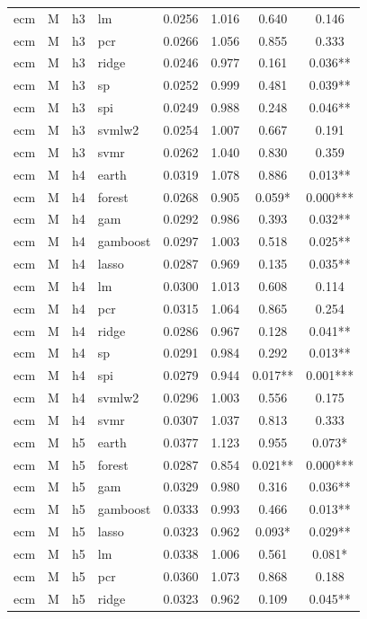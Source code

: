 \begin{ThreePartTable}
\begin{longtable}[t]{llclcccc}
ecm & M & h3 & lm & 0.0256 & 1.016 & 0.640 & 0.146\\
ecm & M & h3 & pcr & 0.0266 & 1.056 & 0.855 & 0.333\\
ecm & M & h3 & ridge & 0.0246 & 0.977 & 0.161 & 0.036**\\
ecm & M & h3 & sp & 0.0252 & 0.999 & 0.481 & 0.039**\\
ecm & M & h3 & spi & 0.0249 & 0.988 & 0.248 & 0.046**\\
ecm & M & h3 & svmlw2 & 0.0254 & 1.007 & 0.667 & 0.191\\
ecm & M & h3 & svmr & 0.0262 & 1.040 & 0.830 & 0.359\\
\addlinespace
ecm & M & h4 & earth & 0.0319 & 1.078 & 0.886 & 0.013**\\
ecm & M & h4 & forest & 0.0268 & 0.905 & 0.059* & 0.000***\\
ecm & M & h4 & gam & 0.0292 & 0.986 & 0.393 & 0.032**\\
ecm & M & h4 & gamboost & 0.0297 & 1.003 & 0.518 & 0.025**\\
ecm & M & h4 & lasso & 0.0287 & 0.969 & 0.135 & 0.035**\\
ecm & M & h4 & lm & 0.0300 & 1.013 & 0.608 & 0.114\\
ecm & M & h4 & pcr & 0.0315 & 1.064 & 0.865 & 0.254\\
ecm & M & h4 & ridge & 0.0286 & 0.967 & 0.128 & 0.041**\\
ecm & M & h4 & sp & 0.0291 & 0.984 & 0.292 & 0.013**\\
ecm & M & h4 & spi & 0.0279 & 0.944 & 0.017** & 0.001***\\
ecm & M & h4 & svmlw2 & 0.0296 & 1.003 & 0.556 & 0.175\\
ecm & M & h4 & svmr & 0.0307 & 1.037 & 0.813 & 0.333\\
\addlinespace
ecm & M & h5 & earth & 0.0377 & 1.123 & 0.955 & 0.073*\\
ecm & M & h5 & forest & 0.0287 & 0.854 & 0.021** & 0.000***\\
ecm & M & h5 & gam & 0.0329 & 0.980 & 0.316 & 0.036**\\
ecm & M & h5 & gamboost & 0.0333 & 0.993 & 0.466 & 0.013**\\
ecm & M & h5 & lasso & 0.0323 & 0.962 & 0.093* & 0.029**\\
ecm & M & h5 & lm & 0.0338 & 1.006 & 0.561 & 0.081*\\
ecm & M & h5 & pcr & 0.0360 & 1.073 & 0.868 & 0.188\\
ecm & M & h5 & ridge & 0.0323 & 0.962 & 0.109 & 0.045**\\

\end{longtable}
\end{ThreePartTable}
